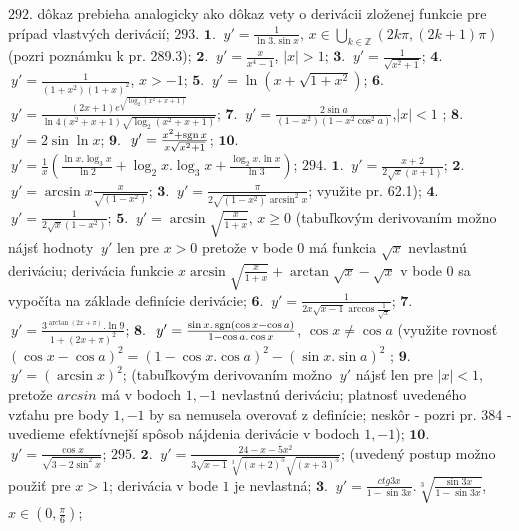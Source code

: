 $\boxed{292.}$ dôkaz prebieha analogicky ako dôkaz vety o derivácii zloženej funkcie pre prípad vlastvých derivácií;
$\boxed{293.}$ 
$\boldsymbol{1.}$ $\ y'= \frac{1}{\ln 3 . \sin x}, \, x \in \bigcup\limits_{k \in \mathbb{Z}}(2k\pi, (2k+1)\pi)$ (pozri poznámku k pr. 289.3);
$\boldsymbol{2.}$ $\ y'= \frac{x}{x^{4}-1}$, $\vert x\vert >1 $;
$\boldsymbol{3.}$ $\ y'= \frac{1}{\sqrt{x^{2}+1}}$;
$\boldsymbol{4.}$ $\ y'= \frac{1}{(1+x^{2})(1+x)^{2}}$, $ x >-1 $;
$\boldsymbol{5.}$ $\ y'= \ln (x+\sqrt{1+x^{2}})$;
$\boldsymbol{6.}$ $\ y'= \frac{(2x+1) e^{\sqrt{\log _{2}(x^{2}+x+1)}}}{\ln 4(x^{2}+x+1)\sqrt{\log_{2}(x^{2}+x+1)}}$;
$\boldsymbol{7.}$ $\ y'= \frac{2\sin a}{(1-x^{2})(1-x^{2}\cos ^{2}a)}$,$\vert x\vert <1 $ ;
$\boldsymbol{8.}$ $\ y'= 2\sin \ln x $;
$\boldsymbol{9.}$ $\ y'= \frac{x^{2}+\operatorname{sgn} x}{x\sqrt{x^{2}+1}}$;
$\boldsymbol{10.}$ $\ y'= \frac{1}{x}(\frac{\ln x. \log _{3}x}{\ln 2}+\log _{2}x.\log _{3}x+\frac{\log _{2}x.\ln x}{\ln 3})$;
$\boxed{294.}$ 
$\boldsymbol{1.}$ $\ y'=\frac{x+2}{2\sqrt{x}(x+1)} $;
$\boldsymbol{2.}$ $\ y'=\arcsin x \frac{x}{\sqrt{(1-x^{2})}} $;
$\boldsymbol{3.}$ $\ y'=\frac{\pi}{2\sqrt{(1-x^{2})}\arcsin ^{2}x} $; využite pr. 62.1);
$\boldsymbol{4.}$ $\ y'=\frac{1}{2\sqrt{x}(1-x^{2})} $;
$\boldsymbol{5.}$ $\ y'=\arcsin \sqrt {\frac{x}{1+x}}, \, x\geq 0 $ (tabuľkovým derivovaním možno nájsť hodnoty $\ y'$ len pre $x>0$ pretože v bode $0$ má funkcia $\sqrt{x}$ nevlastnú deriváciu; derivácia funkcie $x \arcsin \sqrt{\frac{x}{1+x}} + \arctan \sqrt{x}-\sqrt{x}$ v bode $0$ sa vypočíta na základe definície derivácie;
$\boldsymbol{6.}$ $\ y'=\frac{1}{2x\sqrt{x-1}\arccos \frac{1}{\sqrt{x}}} $;
$\boldsymbol{7.}$ $\ y'=\frac{3^{\arctan (2x+\pi)}.\ln 9}{1+(2x+\pi)^{2}} $;
$\boldsymbol{8.}$ $\ y'=\frac{\sin x. \operatorname{sgn} (\cos x-\cos a)}{1-\cos a. \cos x} $, $\cos x\ne \cos a $ (využite rovnosť $(\cos x- \cos a )^{2}=(1-\cos x. \cos a )^{2}-(\sin x. \sin a )^{2}$ ;
$\boldsymbol{9.}$ $\ y'=(\arcsin x)^{2} $; (tabuľkovým derivovaním možno $\ y'$ nájsť len pre $ \vert x\vert <1$, pretože $arcsin  $ má v bodoch $1,-1 $ nevlastnú deriváciu; platnosť uvedeného vzťahu pre body $1,-1 $ by sa nemusela overovať z definície; neskôr - pozri pr. 384 - uvedieme efektívnejší spôsob nájdenia derivácie v bodoch $1,-1 $);
$\boldsymbol{10.}$ $\ y'=\frac{\cos x}{\sqrt{3-2\sin ^{2}x}} $;
$\boxed{295.}$ 
$\boldsymbol{2.}$ $\ y'=\frac{24-x-5x^{2}}{3\sqrt{x-1}\sqrt[3]{(x+2)^{5}}\sqrt{(x+3)^{5}}} $; (uvedený postup možno použiť pre $x>1$; derivácia v bode $1$  je nevlastná;
$\boldsymbol{3.}$ $\ y'=\frac{ctg 3x}{1-\sin 3x}.\sqrt[3]{\frac{\sin 3x}{1-\sin 3x}} $, $x\in (0,\frac{\pi}{6} )$;
